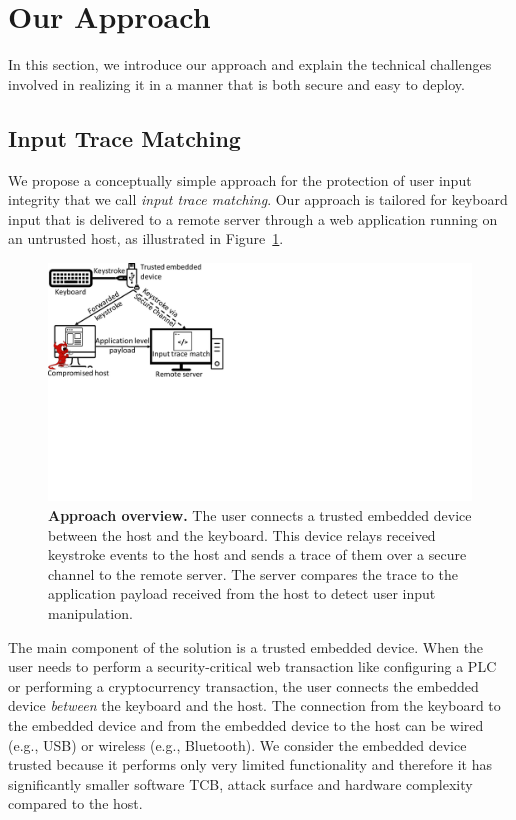 \section{Our Approach}
\label{sec:ourApproach}

In this section, we introduce our approach and explain the technical challenges involved in realizing it in a manner that is both secure and easy to deploy. 

\subsection{Input Trace Matching}

We propose a conceptually simple approach for the protection of user input integrity that we call \emph{input trace matching}. Our approach is tailored for keyboard input that is delivered to a remote server through a web application running on an untrusted host, as illustrated in Figure~\ref{fig:abstractModel}. 

\begin{figure}[t]
 \centering
  \includegraphics[trim={0 9cm 19.5cm 0},clip,width=0.55\linewidth]{chapters/IntegriKey/images/AbstractModel.pdf}
 \caption[Approach overview]{\textbf{Approach overview.} The user connects a trusted embedded device between the host and the keyboard. This device relays received keystroke events to the host and sends a trace of them over a secure channel to the remote server. The server compares the trace to the application payload received from the host to detect user input manipulation.}
 
 \label{fig:abstractModel}
\end{figure}

The main component of the solution is a trusted embedded device. When the user needs to perform a security-critical web transaction like configuring a PLC or performing a cryptocurrency transaction, the user connects the embedded device \emph{between} the keyboard and the host. The connection from the keyboard to the embedded device and from the embedded device to the host can be wired (e.g., USB) or wireless (e.g., Bluetooth). We consider the embedded device trusted because it performs only very limited functionality and therefore it has significantly smaller software TCB, attack surface and hardware complexity compared to the host. 

